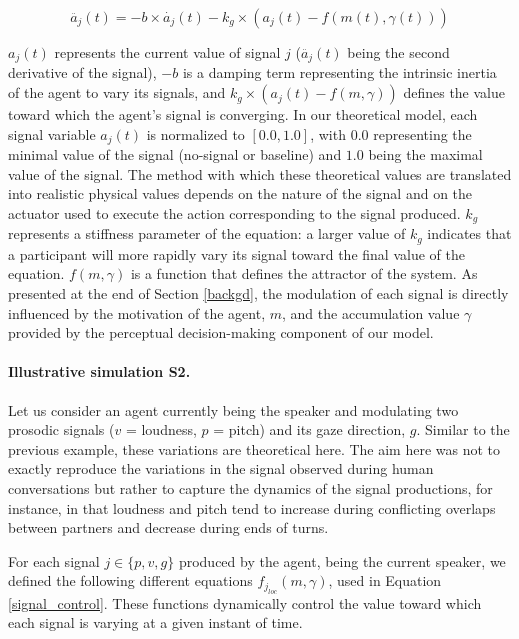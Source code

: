 \documentclass[twocolumn]{svjour3}
\begin{document}
\begin{equation}
  \ddot{a_j}(t)= -b\times\dot{a_j}(t) - k_g \times(a_j(t) - f(m(t),\gamma(t)))
  \label{signal_control}
\end{equation}

$a_j(t)$ represents the current value of signal $j$ ($\ddot{a_j}(t)$ being the second derivative of the signal), $-b$ is a damping term representing the intrinsic inertia of the agent to vary its signals, and $k_g\times(a_j(t)-f(m,\gamma))$ defines the value toward which the agent's signal is converging. In our theoretical model, each signal variable $a_j(t)$ is normalized to $ [0.0,1.0] $, with $0.0$ representing the minimal value of the signal (no-signal or baseline) and $1.0$ being the maximal value of the signal. The method with which these theoretical values are translated into realistic physical values depends on the nature of the signal and on the actuator used to execute the action corresponding to the signal produced. 
$k_g$ represents a stiffness parameter of the equation: a larger value of $k_g$ indicates that a participant will more rapidly vary its signal toward the final value of the equation. 
$f(m,\gamma)$ is a function that defines the attractor of the system. As presented at the end of Section \ref{backgd}, the modulation of each signal is directly influenced by the motivation of the agent, $m$, and the accumulation value $\gamma$ provided by the perceptual decision-making component of our model.

\paragraph{Illustrative simulation S2.} Let us consider an agent currently being the speaker and modulating two prosodic signals ($v$ = loudness, $p$ = pitch) and its gaze direction, $g$. 
Similar to the previous example, these variations are theoretical here.
The aim here was not to  exactly reproduce the variations in the signal observed during human conversations but rather to capture the dynamics of the signal productions, for instance, in that loudness and pitch tend to increase %
during conflicting overlaps between partners and decrease during ends of turns. 

For each signal $j \in \lbrace p,v,g \rbrace$ produced by the agent, being the current speaker, we defined the following different equations $f_{j_{loc}}(m,\gamma)$, used in Equation \ref{signal_control}.
These functions dynamically control the value toward which each signal is varying at a given instant of time.
\end{document}
